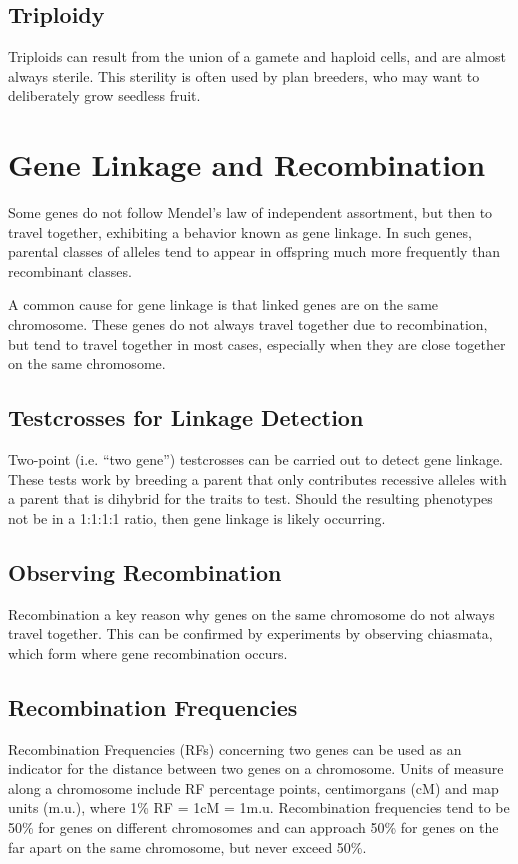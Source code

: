 \documentclass[12pt,titlepage]{article}
\begin{document}
      \subsection{Triploidy}
        Triploids can result from the union of a gamete and haploid cells, and are almost always sterile. This sterility is often used by plan breeders,
        who may want to deliberately grow seedless fruit.

    \section{Gene Linkage and Recombination}
      Some genes do not follow Mendel's law of independent assortment, but then to travel together, exhibiting a behavior known as gene linkage. In such
      genes, parental classes of alleles tend to appear in offspring much more frequently than recombinant classes.

      A common cause for gene linkage is that linked genes are on the same chromosome. These genes do not always travel together due to recombination, but
      tend to travel together in most cases, especially when they are close together on the same chromosome.

      \subsection{Testcrosses for Linkage Detection}
        Two-point (i.e. ``two gene'') testcrosses can be carried out to detect gene linkage. These tests work by breeding a parent that only contributes
        recessive alleles with a parent that is dihybrid for the traits to test. Should the resulting phenotypes not be in a 1:1:1:1 ratio, then gene linkage
        is likely occurring.

      \subsection{Observing Recombination}
        Recombination a key reason why genes on the same chromosome do not always travel together. This can be confirmed by experiments by observing
        chiasmata, which form where gene recombination occurs.

      \subsection{Recombination Frequencies}
        Recombination Frequencies (RFs) concerning two genes can be used as an indicator for the distance between two genes on a chromosome. Units of measure
        along a chromosome include RF percentage points, centimorgans (cM) and map units (m.u.), where 1\% RF = 1cM = 1m.u. Recombination frequencies tend to
        be 50\% for genes on different chromosomes and can approach 50\% for genes on the far apart on the same chromosome, but never exceed 50\%.
\end{document}
